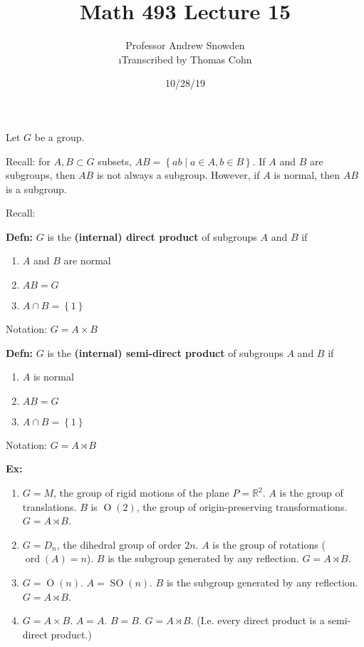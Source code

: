 \documentclass[10pt,letterpaper]{article}
\author{Professor Andrew Snowden\\ \small\i{Transcribed by Thomas Cohn}}
\title{Math 493 Lecture 15}
\date{10/28/19} %
\newcommand{\n}{\hfill\break}
\newcommand{\up}{\vspace{-\baselineskip}}
\newcommand{\hangblock}[2]{\par\noindent\settowidth{\hangindent}{\textbf{#1: }}\textbf{#1: }\!\!\!#2}
\newcommand{\defn}[1]{\hangblock{Defn}{#1}}
\newcommand{\ex}[1]{\hangblock{Ex}{#1}}
\newcommand{\set}[1]{\left\{#1\right\}}
\newcommand{\reals}{\mathbb{R}}
\newcommand{\R}{\reals}
\DeclareMathOperator{\ord}{ord}
\DeclareMathOperator{\SO}{SO}
\begin{document}
\maketitle
\setlength\RaggedRightParindent{\parindent}
\RaggedRight

\par\noindent
Let $G$ be a group.\n

\par\noindent
Recall: for $A,B\subset{}G$ subsets, $AB=\set{ab\mid{}a\in{}A,b\in{}B}$. If $A$ and $B$ are subgroups, then $AB$ is not always a subgroup. However, if $A$ is normal, then $AB$ is a subgroup.\n

\par\noindent
Recall:
\defn{
	$G$ is the \textbf{(internal) direct product} of subgroups $A$ and $B$ if
	\begin{enumerate}[leftmargin=4\parindent]
		\item $A$ and $B$ are normal
		\item $AB=G$
		\item $A\cap{}B=\set{1}$
	\end{enumerate}\up\n
	Notation: $G=A\times{}B$\n
}

\defn{
	$G$ is the \textbf{(internal) semi-direct product} of subgroups $A$ and $B$ if
	\begin{enumerate}[leftmargin=4\parindent]
		\item $A$ is normal
		\item $AB=G$
		\item $A\cap{}B=\set{1}$
	\end{enumerate}\up\n
	Notation: $G=A\rtimes{}B$\n
}

\ex{
	\begin{enumerate}[leftmargin=4\parindent]
		\item $G=M$, the group of rigid motions of the plane $P=\R^{2}$.\n
		$A$ is the group of translations.\n
		$B$ is $\operatorname{O}(2)$, the group of origin-preserving transformations.\n
		$G=A\rtimes{}B$.\n
		\item $G=D_{n}$, the dihedral group of order $2n$.\n
		$A$ is the group of rotations ($\ord(A)=n$).\n
		$B$ is the subgroup generated by any reflection.\n
		$G=A\rtimes{}B$.\n
		\item $G=\operatorname{O}(n)$.\n
		$A=\SO(n)$.\n
		$B$ is the subgroup generated by any reflection.\n
		$G=A\rtimes{}B$.\n
		\item $G=A\times{}B$.\n
		$A=A$.\n
		$B=B$.\n
		$G=A\rtimes{}B$. (I.e. every direct product is a semi-direct product.)
	\end{enumerate}
}
\end{document}
